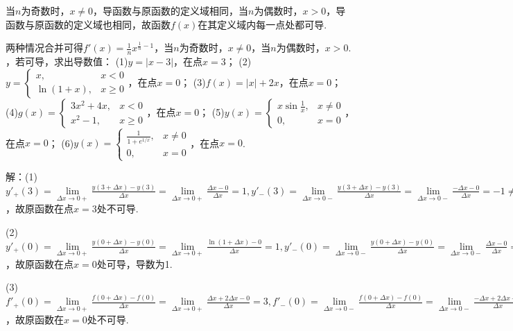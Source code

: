 \documentclass[12pt,UTF8]{ctexart}
\begin{document}
\begin{enumerate}
当$n$为奇数时，$x\neq0$，导函数与原函数的定义域相同，当$n$为偶数时，$x>0$，导函数与原函数的定义域也相同，故函数$f(x)$在其定义域内每一点处都可导.

两种情况合并可得$f'(x)=\frac1nx^{\frac1n-1}$，当$n$为奇数时，$x\neq0$，当$n$为偶数时，$x>0$.
，若可导，求出导数值：
\newline
(1)$y=|x-3|$，在点$x=3$；
\newline
(2)$y=\begin{cases}
x,&x<0\\
\ln(1+x),&x\geq0
\end{cases}$，在点$x=0$；
\newline
(3)$f(x)=|x|+2x$，在点$x=0$；
\newline
(4)$g(x)=\begin{cases}
3x^2+4x,&x<0\\
x^2-1,&x\geq0
\end{cases}$，在点$x=0$；
\newline
(5)$y(x)=\begin{cases}
x\sin\frac1x,&x\neq0\\
0,&x=0
\end{cases}$，在点$x=0$；
\newline
(6)$y(x)=\begin{cases}
\frac1{1+e^{1/x}},&x\neq0\\
0,&x=0
\end{cases}$，在点$x=0$.

解：(1)$y'_+(3)=\lim\limits_{\Delta x\rightarrow0+}\frac{y(3+\Delta x)-y(3)}{\Delta x}=\lim\limits_{\Delta x\rightarrow0+}\frac{\Delta x-0}{\Delta x}=1,y'_-(3)=\lim\limits_{\Delta x\rightarrow0-}\frac{y(3+\Delta x)-y(3)}{\Delta x}=\lim\limits_{\Delta x\rightarrow0-}\frac{-\Delta x-0}{\Delta x}=-1\neq y'_+(3)$，故原函数在点$x=3$处不可导.

(2)$y'_+(0)=\lim\limits_{\Delta x\rightarrow0+}\frac{y(0+\Delta x)-y(0)}{\Delta x}=\lim\limits_{\Delta x\rightarrow0+}\frac{\ln(1+\Delta x)-0}{\Delta x}=1,y'_-(0)=\lim\limits_{\Delta x\rightarrow0-}\frac{y(0+\Delta x)-y(0)}{\Delta x}=\lim\limits_{\Delta x\rightarrow0-}\frac{\Delta x-0}{\Delta x}=1=y'_+(0)$，故原函数在点$x=0$处可导，导数为1.

(3)$f'_+(0)=\lim\limits_{\Delta x\rightarrow0+}\frac{f(0+\Delta x)-f(0)}{\Delta x}=\lim\limits_{\Delta x\rightarrow0+}\frac{\Delta x+2\Delta x-0}{\Delta x}=3,f'_-(0)=\lim\limits_{\Delta x\rightarrow0-}\frac{f(0+\Delta x)-f(0)}{\Delta x}=\lim\limits_{\Delta x\rightarrow0-}\frac{-\Delta x+2\Delta x-0}{\Delta x}=1\neq f'_+(0)$，故原函数在$x=0$处不可导.


\end{enumerate}
\end{document}
